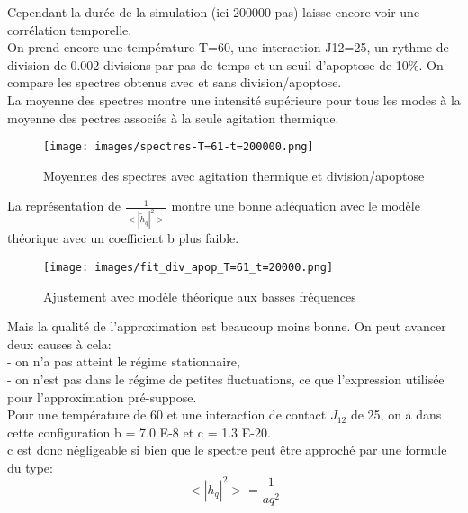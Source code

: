 \documentclass[11pt,a4paper]{article}
\begin{document}
Cependant la durée de la simulation (ici 200000 pas) laisse encore voir une corrélation temporelle.\\

On prend encore une température T=60, une interaction J12=25, un rythme de division de 0.002 divisions par pas de temps et un seuil d'apoptose de 10\%. On compare les spectres obtenus avec et sans division/apoptose.\\ 

La moyenne des spectres montre une intensité supérieure pour tous les modes à la moyenne des pectres associés à la seule agitation thermique.\\

\begin{figure}[H]
\begin{center}
\texttt{[image: images/spectres-T=61-t=200000.png]}
\caption{Moyennes des spectres avec agitation thermique et division/apoptose}
\label{mafigure}
\end{center}
\end{figure}

La représentation de $\frac{1}{<|{\tilde{h}_q}|^{2}>}$ montre une bonne adéquation avec le modèle théorique avec un coefficient b plus faible.


\begin{figure}[H]
\begin{center}
\texttt{[image: images/fit\_div\_apop\_T=61\_t=20000.png]}
\caption{Ajustement avec modèle théorique aux basses fréquences}
\label{mafigure}
\end{center}
\end{figure}

Mais la qualité de l'approximation est beaucoup moins bonne. On peut avancer deux causes à cela:\\
- on n'a pas atteint le régime stationnaire,\\
- on n'est pas dans le régime de petites fluctuations, ce que l'expression utilisée pour l'approximation pré-suppose.\\

Pour une température de 60 et une interaction de contact $J_{12}$ de 25, on a dans cette configuration b = 7.0 E-8 et c = 1.3 E-20.\\
c est donc négligeable si bien que le spectre peut être approché par une formule du type:
\begin{equation}
<|{\tilde{h}_q}|^{2}> = \frac{1}{aq^{2}}
\end{equation}
\end{document}
